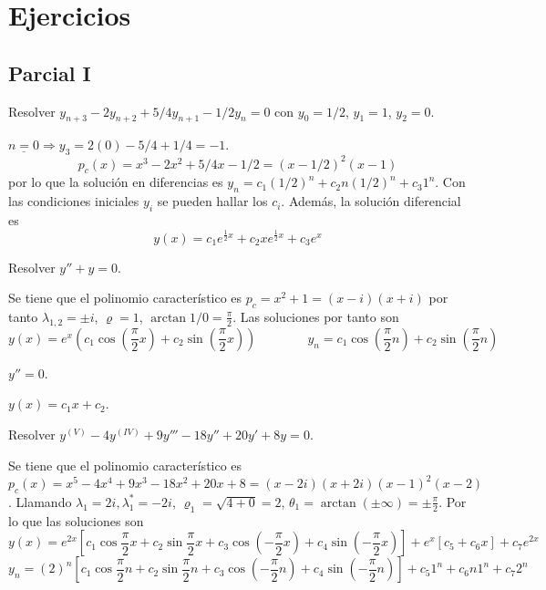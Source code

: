 \chapter{Ejercicios}
\section{Parcial I}
\begin{ejer}
    Resolver $y_{n+3} - 2y_{n+2} + 5/4 y_{n+1} - 1/2 y_n = 0$ con $y_0=1/2$, $y_1=1$, $y_2=0$.
\end{ejer} 
\begin{sol}
    $\underline{n=0} \Rightarrow y_3 = 2(0) - 5/4 + 1/4 = -1$.
$$p_c(x) = x^3 - 2x^2 + 5/4x - 1/2 = (x - 1/2)^2 (x - 1)$$
por lo que la soluci\'on en diferencias es $y_n = c_1(1/2)^n + c_2 n (1/2)^n + c_3 1^n$. Con las condiciones iniciales $y_i$ se pueden hallar los $c_i$. Adem\'as, la soluci\'on diferencial es
$$y(x) = c_1 e^{\frac{1}{2}x} + c_2 x e^{\frac{1}{2}x} + c_3 e^x$$
\end{sol}

\begin{ejer}
    Resolver $y'' + y = 0$.
\end{ejer} 
\begin{sol}
    Se tiene que el polinomio caracter\'istico es $p_c = x^2+1 = (x-i)(x+i)$ por tanto $\lambda_{1,2} = \pm i$, $\varrho = 1$, $\arctan 1/0 = \frac{\pi}{2}$. Las soluciones por tanto son
$$ y(x) = e^{x}\left(c_1 \cos \left( \frac{\pi}{2}x\right) + c_2 \sin \left( \frac{\pi}{2}x\right)\right) \qquad \qquad  y_n = c_1 \cos \left( \frac{\pi}{2}n\right)+ c_2 \sin \left( \frac{\pi}{2}n\right)$$
\end{sol}

\begin{ejer}
    $y'' = 0$.
\end{ejer}
\begin{sol}
    $y(x) = c_1 x + c_2$.
\end{sol}

\begin{ejer}
    Resolver $y^{(V)} - 4y^{(IV)} + 9y''' - 18y'' + 20y' + 8y = 0$.
\end{ejer}
\begin{sol}
    Se tiene que el polinomio caracter\'istico es $p_c(x) = x^5 - 4x^4 + 9x^3 - 18x^2 + 20x + 8 = (x-2i)(x+2i)(x-1)^2(x-2)$.
Llamando $\lambda_1 = 2i, \lambda_1^* = -2i$, $\varrho_1 = \sqrt{4+0} = 2$, $\theta_1 = \arctan(\pm \infty) = \pm \frac{\pi}{2}$. Por lo que las soluciones son
$$y(x) = e^{2x}\left[c_1 \cos \frac{\pi}{2} x + c_2 \sin \frac{\pi}{2} x + c_3 \cos(-\frac{\pi}{2} x) + c_4 \sin(-\frac{\pi}{2} x)\right] + e^x[c_5 + c_6 x] + c_7 e^{2x}$$
$$y_n = (2)^n \left[c_1 \cos \frac{\pi}{2}n + c_2 \sin \frac{\pi}{2}n + c_3 \cos(-\frac{\pi}{2}n) + c_4 \sin(-\frac{\pi}{2}n)\right] + c_5 1^n + c_6 n 1^n + c_7 2^n$$
\end{sol}


